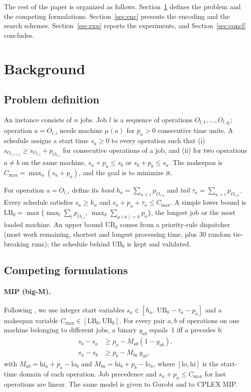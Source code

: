 \documentclass[a4paper,fleqn]{cas-sc}
\newcommand{\Cmax}{C_{\max}}
\begin{document}
The rest of the paper is organized as follows.
Section~\ref{sec:background} defines the problem and the competing formulations.
Section~\ref{sec:enc} presents the encoding and the search schemes.
Section~\ref{sec:exp} reports the experiments, and Section~\ref{sec:concl} concludes.

\section{Background}\label{sec:background}
\subsection{Problem definition}
An instance consists of $n$ jobs. Job $l$ is a sequence of operations $O_{l,1},\dots,O_{l,q_l}$; operation $a=O_{l,i}$ needs machine $\mu(a)$ for $p_a>0$ consecutive time units.
A schedule assigns a start time $s_a\ge0$ to every operation such that
(i) $s_{O_{l,i+1}}\ge s_{O_{l,i}}+p_{O_{l,i}}$ for consecutive operations of a job, and
(ii) for two operations $a\neq b$ on the same machine, $s_a+p_a\le s_b$ or $s_b+p_b\le s_a$.
The makespan is $\Cmax=\max_a (s_a+p_a)$, and the goal is to minimize it.

For operation $a=O_{l,i}$ define its \emph{head} $h_a=\sum_{u<i}p_{O_{l,u}}$ and \emph{tail} $\tau_a=\sum_{u>i}p_{O_{l,u}}$.
Every schedule satisfies $s_a\ge h_a$ and $s_a+p_a+\tau_a\le \Cmax$.
A simple lower bound is $\mathrm{LB}_0=\max\{\max_l\sum_i p_{O_{l,i}},\ \max_k \sum_{\mu(a)=k}p_a\}$, the longest job or the most loaded machine.
An upper bound $\mathrm{UB}_0$ comes from a priority-rule dispatcher (most work remaining, shortest and longest processing time, plus 30 random tie-breaking runs); the schedule behind $\mathrm{UB}_0$ is kept and validated.

\subsection{Competing formulations}
\paragraph{MIP (big-M).}
Following \citet{manne1960}, we use integer start variables $s_a\in[h_a,\ \mathrm{UB}_0-\tau_a-p_a]$ and a makespan variable $\Cmax\in[\mathrm{LB}_0,\mathrm{UB}_0]$.
For every pair $a,b$ of operations on one machine belonging to different jobs, a binary $y_{ab}$ equals~1 iff $a$ precedes $b$:
\begin{align}
 s_b - s_a &\ge p_a - M_{ab}(1-y_{ab}), \label{eq:mip1}\\
 s_a - s_b &\ge p_b - M_{ba}\,y_{ab}, \label{eq:mip2}
\end{align}
with $M_{ab}=\mathrm{hi}_a+p_a-\mathrm{lo}_b$ and $M_{ba}=\mathrm{hi}_b+p_b-\mathrm{lo}_a$, where $[\mathrm{lo},\mathrm{hi}]$ is the start-time domain of each operation.
Job precedence and $s_a+p_a\le\Cmax$ for last operations are linear.
The same model is given to Gurobi and to CPLEX MIP.
\end{document}
